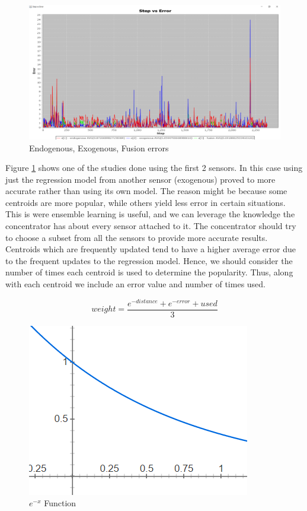 \documentclass{mproj}
\begin{document}
\begin{figure}[H]
\caption{Endogenous, Exogenous, Fusion errors}
\label{fig:functionsErrors}
\centerline{\includegraphics[scale=0.4]{e1e2e3}}
\end{figure}

Figure \ref{fig:functionsErrors} shows one of the studies done using the first 2 sensors. In this case using just the regression model from another sensor (exogenous) proved to more accurate rather than using its own model. The reason might be because some centroids are more popular, while others yield less error in certain situations. This is were ensemble learning is useful, and we can leverage the knowledge the concentrator has about every sensor attached to it. The concentrator should try to choose a subset from all the sensors to provide more accurate results. Centroids which are frequently updated tend to have a higher average error due to the frequent updates to the regression model. Hence, we should consider the number of times each centroid is used to determine the popularity. Thus, along with each centroid we include an error value and number of times used.

\begin{equation}
\label{eq:ourEquation}
weight=\frac{e^{-distance} + e^{-error} + used}{3}
\end{equation}

\begin{figure}[H]
\caption{$e^{-x}$ Function}
\label{fig:e-x}
\centerline{\includegraphics[scale=0.6]{e-x}}
\end{figure}
\end{document}
